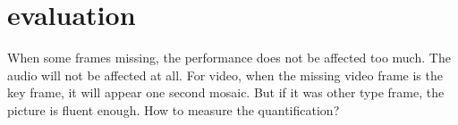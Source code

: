 \section{evaluation} %
\label{sec:evaluation}
When some frames missing, the performance does not be affected too much. The audio will not be affected at all. For video, when the missing video frame is the key frame, it will appear one second mosaic. But if it was other type frame, the picture is fluent enough.
How to measure the quantification?

